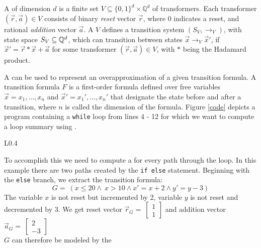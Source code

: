 \subsection{\qvasr}
A \qvasr of dimension $d$ is a finite set $V \subseteq \{0, 1\}^d \times \mathbb{Q}^d$ of transformers. Each transformer $(\vec{r}, \vec{a}) \in V$ consists of binary \textsl{reset} vector $\vec{r}$, where 0 indicates a reset, and rational \textsl{addition} vector $\vec{a}$. A \qvasr $V$ defines a transition system $(S_V, \rightarrow_V)$, with state space $S_V \subseteq \mathbb{Q}^d$, which can transition between states $\vec{x} \rightarrow_V \vec{x}'$, if $\vec{x}' = \vec{r} * \vec{x} + \vec{a}$ for some transformer $(\vec{r}, \vec{a}) \in V$, with $*$ being the Hadamard product. \par A \qvasr can be used to represent an overapproximation of a given transition formula. A transition formula $F$ is a first-order formula defined over free variables $\vec{x} = x_1, \ldots, x_n$ and $\vec{x}' = x_1', \ldots, x_n'$ that designate the state before and after a transition, where $n$ is called the dimension of the formula. Figure \ref{code} depicts a program containing a \texttt{while} loop from lines 4 - 12 for which we want to compute a loop summary using \qvasr.
\begin{wrapfigure}{L}{0.4\linewidth}
	\vspace{-10pt}
	\centering
	
	\caption{Program $P$ \\ with \texttt{while} loop.}
	\label{code}
\end{wrapfigure}
To accomplish this we need to compute a \qvasr for every path through the loop. In this example there are two paths created by the \texttt{if else} statement.
Beginning with the \texttt{else} branch, we extract the transition formula:
\begin{equation*}
	G= \ (x \leq 20 \land\ x > 10 \land x' = x + 2 \land y' = y - 3)
\end{equation*}
The variable $x$ is not reset but incremented by 2, variable $y$ is not reset and decremented by 3.
We get reset vector $
\vec{r}_G = \  
\begin{bmatrix}
	1 \\
	1 
\end{bmatrix}
$
and addition vector $
\vec{a}_G = \ 
\begin{bmatrix}
	2 \\
	-3 
\end{bmatrix}$ \\
$G$ can therefore be modeled by the \qvasr
